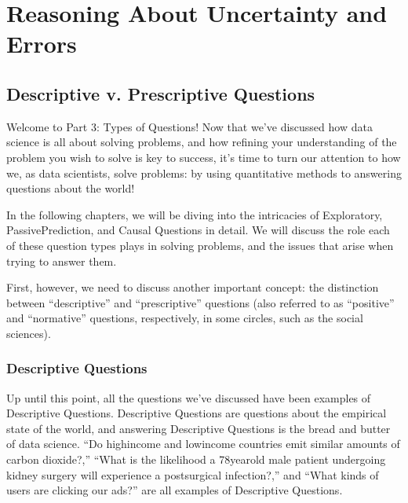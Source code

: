 \documentclass[letterpaper,10pt,english]{jupyterBook}
\begin{document}
\sphinxstepscope


\part{Reasoning About Uncertainty and Errors}

\sphinxstepscope


\chapter{Descriptive v. Prescriptive Questions}
\label{\detokenize{30_questions/05_descriptive_v_prescriptive:descriptive-v-prescriptive-questions}}\label{\detokenize{30_questions/05_descriptive_v_prescriptive::doc}}
\sphinxAtStartPar
Welcome to Part 3: Types of Questions! Now that we’ve discussed how data science is all about solving problems, and how refining your understanding of the problem you wish to solve is key to success, it’s time to turn our attention to how we, as data scientists, solve problems: by using quantitative methods to answering questions about the world!

\sphinxAtStartPar
In the following chapters, we will be diving into the intricacies of Exploratory, Passive\sphinxhyphen{}Prediction, and Causal Questions in detail. We will discuss the role each of these question types plays in solving problems, and the issues that arise when trying to answer them.

\sphinxAtStartPar
First, however, we need to discuss another important concept: the distinction between “descriptive” and “prescriptive” questions (also referred to as “positive” and “normative” questions, respectively, in some circles, such as the social sciences).


\section{Descriptive Questions}
\label{\detokenize{30_questions/05_descriptive_v_prescriptive:descriptive-questions}}
\sphinxAtStartPar
Up until this point, all the questions we’ve discussed have been examples of Descriptive Questions. Descriptive Questions are questions about the empirical state of the world, and answering Descriptive Questions is the bread and butter of data science. “Do high\sphinxhyphen{}income and low\sphinxhyphen{}income countries emit similar amounts of carbon dioxide?,” “What is the likelihood a 78\sphinxhyphen{}year\sphinxhyphen{}old male patient undergoing kidney surgery will experience a post\sphinxhyphen{}surgical infection?,” and “What kinds of users are clicking our ads?” are all examples of Descriptive Questions.
\end{document}
